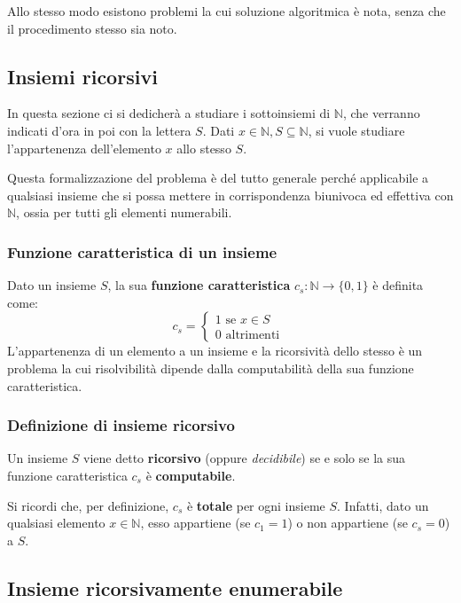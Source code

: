 \documentclass[italian, 10pt]{article}
\begin{document}
Allo stesso modo esistono problemi la cui soluzione algoritmica è nota, senza che il procedimento stesso sia noto.

\subsection{Insiemi ricorsivi}
\label{sec:insiemi-ricorsivi}

In questa sezione ci si dedicherà a studiare i sottoinsiemi di \(\mathbb{N}\), che verranno indicati d'ora in poi con la lettera \(S\).
Dati \(x \in \mathbb{N}, S \subseteq \mathbb{N}\), si vuole studiare l'appartenenza dell'elemento \(x\) allo stesso \(S\).

Questa formalizzazione del problema è del tutto generale perché applicabile a qualsiasi insieme che si possa mettere in corrispondenza biunivoca ed effettiva con \(\mathbb{N}\), ossia per tutti gli elementi numerabili.

\subsubsection{Funzione caratteristica di un insieme}

Dato un insieme \(S\), la sua \textbf{funzione caratteristica} \(c_s : \mathbb{N} \rightarrow \{0, 1\}\) è definita come:
\[
  c_s = \begin{cases}
    1 \text{ se } x \in S \\
    0 \text{ altrimenti }
  \end{cases}
\]
L'appartenenza di un elemento a un insieme e la ricorsività dello stesso è un problema la cui risolvibilità dipende dalla computabilità della sua funzione caratteristica.

\subsubsection{Definizione di insieme ricorsivo}

Un insieme \(S\) viene detto \textbf{ricorsivo} (oppure \textit{decidibile})  se e solo se la sua funzione caratteristica \(c_s\) è \textbf{computabile}.

Si ricordi che, per definizione, \(c_s\) è \textbf{totale} per ogni insieme \(S\).
Infatti, dato un qualsiasi elemento \(x \in \mathbb{N}\), esso appartiene (se \(c_1=1\)) o non appartiene (se \(c_s = 0\)) a \(S\).

\subsection{Insieme ricorsivamente enumerabile}
\label{sec:insieme-ricorsivamente-enumerabile}
\end{document}
